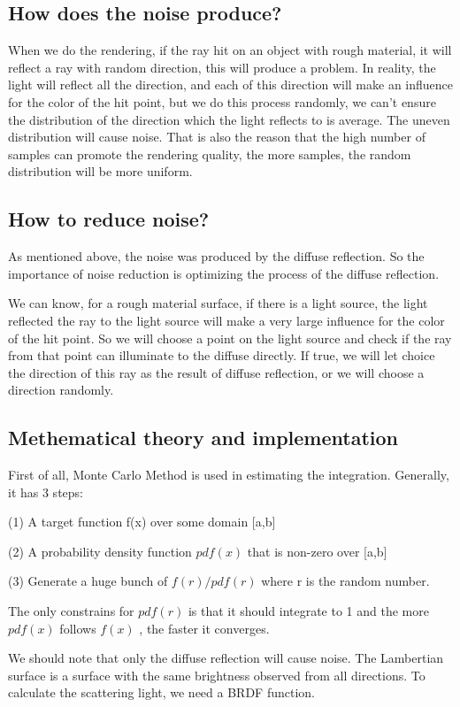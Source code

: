 \documentclass[10pt,conference,compsoc]{IEEEtran}
\begin{document}
\subsection{How does the noise produce?}
When we do the rendering, if the ray hit on an object with rough material, it will reflect a ray with random direction, this will produce a problem. In reality, the light will reflect all the direction, and each of this direction will make an influence for the color of the hit point, but we do this process randomly, we can’t ensure the distribution of the direction which the light reflects to is average. The uneven distribution will cause noise. That is also the reason that the high number of samples can promote the rendering quality, the more samples, the random distribution will be more uniform.

\subsection{How to reduce noise?}
As mentioned above, the noise was produced by the diffuse reflection. So the importance of noise reduction is optimizing the process of the diffuse reflection. 


We can know, for a rough material surface, if there is a light source, the light reflected the ray to the light source will make a very large influence for the color of the hit point. So we will choose a point on the light source and check if the ray from that point can illuminate to the diffuse directly. If true, we will let choice the direction of this ray as the result of diffuse reflection, or we will choose a direction randomly.

\subsection{Methematical theory and implementation}
First of all, Monte Carlo Method is used in estimating the integration. Generally, it has 3 steps:

(1) A target function f(x) over some domain [a,b]

(2) A probability density function $pdf(x)$ that is non-zero over [a,b]

(3) Generate a huge bunch of $f(r)/pdf(r)$ where r is the random number.

The only constrains for $pdf(r)$ is that it should integrate to 1 and the more  $pdf(x)$  follows $f(x)$  , the faster it converges.

We should note that only the diffuse reflection will cause noise.  The Lambertian surface is a surface with the same brightness observed from all directions. To calculate the scattering light, we need a BRDF function.
\end{document}

